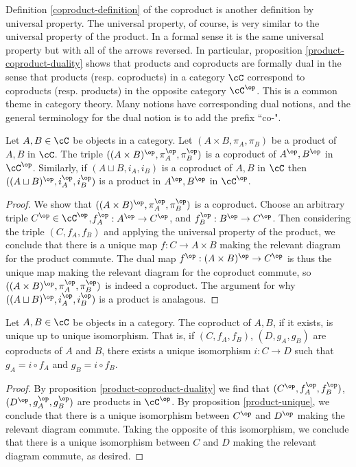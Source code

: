 \begin{rem} Definition \ref{coproduct-definition} of the coproduct is another definition by universal property. The universal property, of course, is very similar to the universal property of the product. In a formal sense it is the same universal property but with all of the arrows reversed. In particular, proposition \ref{product-coproduct-duality} shows that products and coproducts are formally dual in the sense that products (resp. coproducts) in a category $\cC$ correspond to coproducts (resp. products) in the opposite category $\cC^{\op}$. This is a common theme in category theory. Many notions have corresponding dual notions, and the general terminology for the dual notion is to add the prefix ``co-".
\end{rem}

\begin{prop}\label{product-coproduct-duality} Let $A,B\in \cC$ be objects in a category. Let $(A\times B,\pi_A,\pi_B)$ be a product of $A,B$ in $\cC$. The triple $((A\times B)^{\op},\pi_A^{\op},\pi_B^{\op})$ is a coproduct of $A^{\op},B^{\op}$ in $\cC^{\op}$. Similarly, if $(A\sqcup B,i_A,i_B)$ is a coproduct of $A,B$ in $\cC$ then $((A\sqcup B)^{\op},i_A^{\op},i_B^{\op})$ is a product in $A^{\op},B^{\op}$ in $\cC^{\op}$.
\end{prop}
\begin{proof} We show that $((A\times B)^{\op},\pi_A^{\op},\pi_B^{\op})$ is a coproduct. Choose an arbitrary triple $C^{\op}\in \cC^{\op}$,$f^{\op}_A:A^{\op}\to C^{\op}$, and $f^{\op}_B:B^{\op}\to C^{\op}$. Then considering the triple $(C,f_A,f_B)$ and applying the universal property of the product, we conclude that there is a unique map $f:C\to A\times B$ making the relevant diagram for the product commute. The dual map $f^{\op}:(A\times B)^{\op}\to C^{\op}$ is thus the unique map making the relevant diagram for the coproduct commute, so $((A\times B)^{\op},\pi_A^{\op},\pi_B^{\op})$ is indeed a coproduct. The argument for why $((A\sqcup B)^{\op},i_A^{\op},i_B^{\op})$ is a product is analagous.
\end{proof}

\begin{cor} Let $A,B \in \cC$ be objects in a category. The coproduct of $A,B$, if it exists, is unique up to unique isomorphism. That is, if $(C,f_A,f_B)$, $(D,g_A,g_B)$ are coproducts of $A$ and $B$, there exists a unique isomorphism $i:C\to D$ such that $g_A=i\circ f_A$ and $g_B=i\circ f_B$.
\end{cor}
\begin{proof} By proposition \ref{product-coproduct-duality} we find that $(C^{\op},f_A^{\op},f_B^{\op})$, $(D^{\op},g_A^{\op},g_B^{\op})$ are products in $\cC^{\op}$. By proposition \ref{product-unique}, we conclude that there is a unique isomorphism between $C^{\op}$ and $D^{\op}$ making the relevant diagram commute. Taking the opposite of this isomorphism, we conclude that there is a unique isomorphism between $C$ and $D$ making the relevant diagram commute, as desired.
\end{proof}

